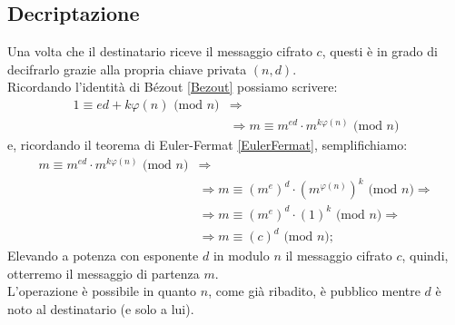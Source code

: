 \documentclass[a4paper,12pt]{article}
\begin{document}
\subsection{Decriptazione}
Una volta che il destinatario riceve il messaggio cifrato $c$, questi è in grado di decifrarlo grazie alla propria chiave privata $(n,d)$.\\
Ricordando l'identità di B\'ezout \eqref{Bezout} possiamo scrivere:
\begin{equation}
\begin{split}
1 \equiv ed+k\varphi(n) \text{ (mod $n$)} & \Longrightarrow\\
& \Longrightarrow m \equiv m^{ed} \cdot m^{k\varphi(n)} \text{ (mod $n$)}
\end{split}
\end{equation}
e, ricordando il teorema di Euler-Fermat \eqref{EulerFermat}, semplifichiamo:
\begin{equation}
\begin{split}
m \equiv m^{ed} \cdot m^{k\varphi(n)} \text{ (mod $n$)} & \Longrightarrow\\
& \Longrightarrow m \equiv \left(m^{e}\right)^{d} \cdot \left(m^{\varphi(n)}\right)^{k} \text{ (mod $n$)} \Longrightarrow \\
& \Longrightarrow m \equiv \left(m^{e}\right)^{d} \cdot \left(1\right)^{k} \text{ (mod $n$)} \Longrightarrow \\
& \Longrightarrow m \equiv \left(c\right)^{d} \text{ (mod $n$)};
\end{split}
\end{equation}
Elevando a potenza con esponente $d$ in modulo $n$ il messaggio cifrato $c$, quindi, otterremo il messaggio di partenza $m$.\\
L'operazione è possibile in quanto $n$, come già ribadito, è pubblico mentre $d$ è noto al destinatario (e solo a lui).

\newpage
\end{document}
